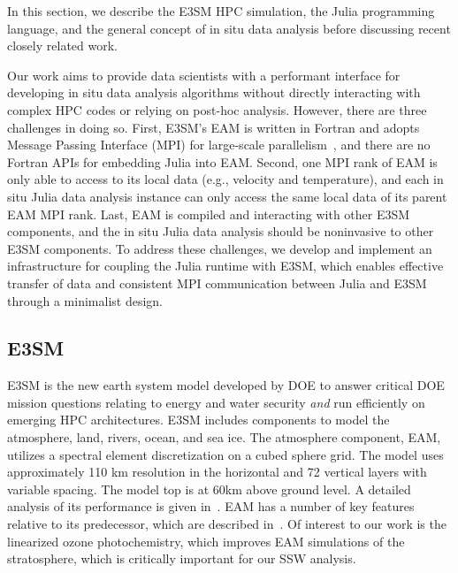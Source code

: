 \documentclass{juliacon}
\begin{document}
In this section, we describe the E3SM HPC simulation, the Julia programming language, and the general concept of in situ data analysis before discussing recent closely related work.





Our work aims to provide data scientists with a performant interface for developing in situ data analysis algorithms without directly interacting with complex HPC codes or relying on post-hoc analysis. However, there are three challenges in doing so. First, E3SM's EAM is written in Fortran and adopts Message Passing Interface (MPI) for large-scale parallelism~\cite{walker1996mpi}, and there are no Fortran APIs for embedding Julia into EAM. Second, one MPI rank of EAM is only able to access to its local data (e.g., velocity and temperature), and each in situ Julia data analysis instance can only access the same local data of its parent EAM MPI rank. Last, EAM is compiled and interacting with other E3SM components, and the in situ Julia data analysis should be noninvasive to other E3SM components. To address these challenges, we develop and implement an infrastructure for coupling the Julia runtime with E3SM, which enables effective transfer of data and consistent MPI communication between Julia and E3SM through a minimalist design. 


\subsection{E3SM}

E3SM is the new earth system model developed by DOE to answer critical DOE mission questions relating to energy and water security \emph{and} run efficiently on emerging HPC architectures.  E3SM includes components to model the atmosphere, land, rivers, ocean, and sea ice. The atmosphere component, EAM, utilizes a spectral element discretization on a cubed sphere grid.  The model uses approximately 110 km resolution in the horizontal and 72 vertical layers with variable spacing.  The model top is at 60km above ground level.  A detailed analysis of its performance is given in~\cite{xie2018understanding,zhang2019evaluation,qian2018parametric,rasch2019overview,golaz2019doe}.  EAM has a number of key features relative to its predecessor, which are described in~\cite{golaz2019doe}.  Of interest to our work is the linearized ozone photochemistry, which improves EAM simulations of the stratosphere, which is critically important for our SSW analysis.
\end{document}
